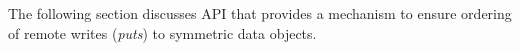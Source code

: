 The following section discusses \openshmem \ac{API} that provides a mechanism to ensure ordering of remote writes (\textit{puts}) to symmetric data objects. 
